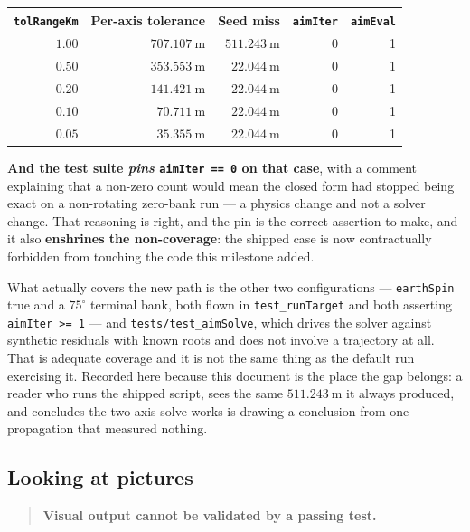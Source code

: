 \documentclass[11pt]{article}
\newcommand{\code}[1]{\texttt{#1}}
\begin{document}
\begin{center}
\begin{tabular}{rrrrr}
\toprule
\code{tolRangeKm} & Per-axis tolerance & Seed miss & \code{aimIter} & \code{aimEval} \\
\midrule
$1.00$ & $707.107~\mathrm{m}$ & $511.243~\mathrm{m}$ & 0 & 1 \\
$0.50$ & $353.553~\mathrm{m}$ & $22.044~\mathrm{m}$  & 0 & 1 \\
$0.20$ & $141.421~\mathrm{m}$ & $22.044~\mathrm{m}$  & 0 & 1 \\
$0.10$ & $70.711~\mathrm{m}$  & $22.044~\mathrm{m}$  & 0 & 1 \\
$0.05$ & $35.355~\mathrm{m}$  & $22.044~\mathrm{m}$  & 0 & 1 \\
\bottomrule
\end{tabular}
\end{center}

\textbf{And the test suite \emph{pins} \code{aimIter == 0} on that case}, with
a comment explaining that a non-zero count would mean the closed form had
stopped being exact on a non-rotating zero-bank run --- a physics change and
not a solver change. That reasoning is right, and the pin is the correct
assertion to make, and it also \textbf{enshrines the non-coverage}: the shipped
case is now contractually forbidden from touching the code this milestone
added.

What actually covers the new path is the other two configurations ---
\code{earthSpin} true and a $75^\circ$ terminal bank, both flown in
\code{test\_runTarget} and both asserting \code{aimIter >= 1} --- and
\code{tests/test\_aimSolve}, which drives the solver against synthetic
residuals with known roots and does not involve a trajectory at all. That is
adequate coverage and it is not the same thing as the default run exercising
it. Recorded here because this document is the place the gap belongs: a
reader who runs the shipped script, sees the same $511.243~\mathrm{m}$ it
always produced, and concludes the two-axis solve works is drawing a
conclusion from one propagation that measured nothing.

\subsection{Looking at pictures}

\begin{quote}
\textbf{Visual output cannot be validated by a passing test.}
\end{quote}
\end{document}
